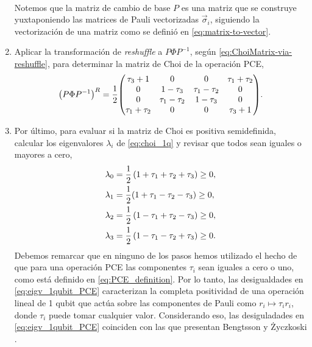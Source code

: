 \begin{enumerate}
\begin{align}
	\end{align}
	Notemos que la matriz de cambio de base $P$ es una matriz 
	que se construye yuxtaponiendo las matrices de Pauli 
	vectorizadas $\vec{\sigma}_i$, 
	siguiendo la vectorización de una matriz como se definió en 
	\eqref{eq:matrix-to-vector}.
	\item Aplicar la transformación de \textit{reshuffle} a $P\Phi P^{-1}$,  
	según \eqref{eq:ChoiMatrix-via-reshuffle}, para 
	determinar la matriz de Choi de la operación PCE,
	\begin{align}\label{eq:choi_1q}
		\qty(P \Phi P^{-1})^R=
		\frac{1}{2}\mqty(
		\tau _3+1 & 0 & 0 & \tau _1+\tau _2 \\
		0 & 1-\tau _3 & \tau _1-\tau _2 & 0 \\
		0 & \tau _1-\tau _2 & 1-\tau _3 & 0 \\
		\tau _1+\tau _2 & 0 & 0 & \tau _3+1 
		).
	\end{align}
	\item Por último, para evaluar si la matriz de Choi es positiva semidefinida, 
	calcular los eigenvalores $\lambda_i$ de \eqref{eq:choi_1q} y revisar que 
	todos sean 	iguales o mayores a cero,
	\begin{subequations}\label{eq:eigv_1qubit_PCE}
		\begin{align}
			\lambda_0=\frac{1}{2}& \left(1+\tau _1+\tau _2+\tau _3\right)\geq0, \\
			\lambda_1=\frac{1}{2}& \qty(1+\tau _1-\tau _2-\tau _3)\geq0, \\
			\lambda_2=\frac{1}{2}& \left(1-\tau _1+\tau _2-\tau _3\right)\geq0, \\
			\lambda_3=\frac{1}{2}& \left(1-\tau _1-\tau _2+\tau _3\right)\geq0.
		\end{align}
	\end{subequations}
	Debemos remarcar que en ninguno de los pasos hemos utilizado el hecho de que
	para una operación PCE las componentes $\tau_i$ sean iguales a cero o uno,
	como está definido en \eqref{eq:PCE_definition}. Por lo tanto, las 
	desigualdades en \eqref{eq:eigv_1qubit_PCE} caracterizan la completa 
	positividad de una operación lineal de 1 qubit que actúa sobre las
	componentes de Pauli como $r_i\longmapsto \tau_ir_i$, donde $\tau_i$
	puede tomar cualquier valor. Considerando eso, 
	las desiguladades en \eqref{eq:eigv_1qubit_PCE} coinciden con las 
	que presentan 	Bengtsson y Życzkoski
	 \cite[pág. 292]{bengtsson_zyczkowski_2017}.
\end{enumerate}

